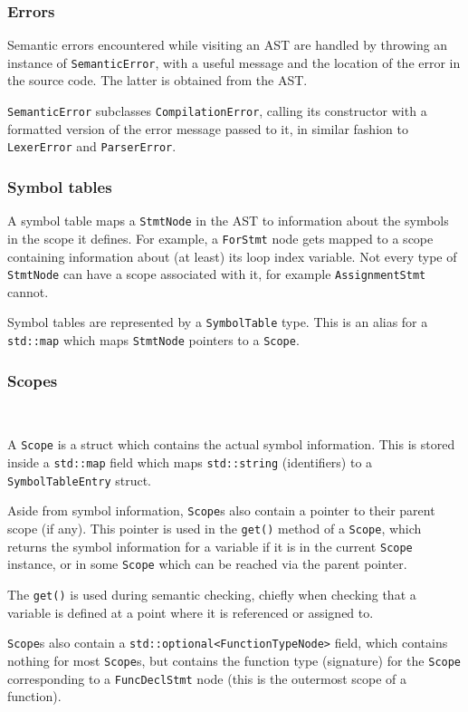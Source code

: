 \documentclass[11pt,a4paper]{scrartcl}
\begin{document}
\subsubsection{Errors}

Semantic errors encountered while visiting an AST are handled by throwing an instance of \verb|SemanticError|, with a useful message and the location of the error in the source code. The latter is obtained from the AST.

\verb|SemanticError| subclasses \verb|CompilationError|, calling its constructor with a formatted version of the error message passed to it, in similar fashion to \verb|LexerError| and \verb|ParserError|.

\subsubsection{Symbol tables}

A symbol table maps a \verb|StmtNode| in the AST to information about the symbols in the scope it defines. For example, a \verb|ForStmt| node gets mapped to a scope containing information about (at least) its loop index variable. Not every type of \verb|StmtNode| can have a scope associated with it, for example \verb|AssignmentStmt| cannot.

Symbol tables are represented by a \Verb|SymbolTable| type. This is an alias for a \verb|std::map| which maps \verb|StmtNode| pointers to a \verb|Scope|.

\subsubsection{Scopes}~\label{scope-sect}

A \verb|Scope| is a struct which contains the actual symbol information. This is stored inside a \verb|std::map| field which maps \verb|std::string| (identifiers) to a \verb|SymbolTableEntry| struct.

Aside from symbol information, \verb|Scope|s also contain a pointer to their parent scope (if any). This pointer is used in the \verb|get()| method of a \verb|Scope|, which returns the symbol information for a variable if it is in the current \verb|Scope| instance, or in some \verb|Scope| which can be reached via the parent pointer.

The \verb|get()| is used during semantic checking, chiefly when checking that a variable is defined at a point where it is referenced or assigned to.

\verb|Scope|s also contain a \verb|std::optional<FunctionTypeNode>| field, which contains nothing for most \verb|Scope|s, but contains the function type (signature) for the \verb|Scope| corresponding to a \verb|FuncDeclStmt| node (this is the outermost scope of a function).
\end{document}
